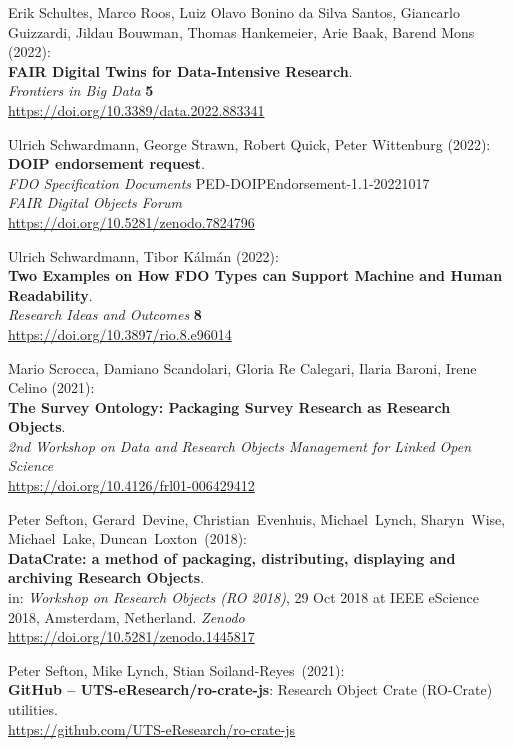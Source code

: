 \begin{thebibliography}{9}
Erik Schultes, Marco Roos, Luiz Olavo Bonino da Silva Santos, Giancarlo Guizzardi, Jildau Bouwman, Thomas Hankemeier, Arie Baak, Barend Mons (2022):\\
\textbf{FAIR Digital Twins for Data-Intensive Research}.\\
\emph{Frontiers in Big Data} \textbf{5}\\
\url{https://doi.org/10.3389/data.2022.883341}

Ulrich Schwardmann, George Strawn, Robert Quick, Peter Wittenburg (2022): \\
\textbf{DOIP endorsement request}.\\
\emph{FDO Specification Documents} PED-DOIPEndorsement-1.1-20221017\\
\emph{FAIR Digital Objects Forum}\\
\url{https://doi.org/10.5281/zenodo.7824796}

Ulrich Schwardmann, Tibor Kálmán (2022): \\
\textbf{Two {Examples} on {How FDO Types} can {Support Machine} and {Human Readability}}.\\
\emph{Research Ideas and Outcomes} \textbf{8} \\
\url{https://doi.org/10.3897/rio.8.e96014}

Mario Scrocca, Damiano Scandolari, Gloria Re Calegari, Ilaria Baroni, Irene Celino (2021):\\
\textbf{The Survey Ontology: Packaging Survey Research as Research Objects}.\\
\emph{2nd Workshop on Data and Research Objects Management for Linked Open Science}\\
\url{https://doi.org/10.4126/frl01-006429412}

Peter Sefton, Gerard~Devine, Christian~Evenhuis, Michael~Lynch, Sharyn~Wise,
Michael~Lake, Duncan~Loxton~(2018):\\
\textbf{DataCrate: a method of packaging, distributing, displaying and
archiving Research Objects}.\\
in: \emph{Workshop on Research Objects (RO 2018)}, 29 Oct 2018 at IEEE
eScience 2018, Amsterdam, Netherland. \emph{Zenodo}\\
\url{https://doi.org/10.5281/zenodo.1445817}

Peter Sefton, Mike Lynch, Stian Soiland-Reyes~(2021):\\
\textbf{GitHub -- UTS-eResearch/ro-crate-js}: Research Object Crate
(RO-Crate) utilities.\\
\url{https://github.com/UTS-eResearch/ro-crate-js}


\end{thebibliography}
